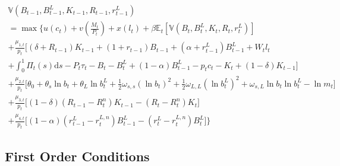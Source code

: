 \documentclass[11pt,a4paper,margin=1.5in]{article}
\begin{document}
\begin{multline}
	\mathbb{V}\!\left(B_{t-1}, B^L_{t-1}, K_{t-1}, R_{t-1}, r^L_{t-1}\right) \\= \max \Bigg\{u(c_t) + v\left(\frac{M_t}{P_t}\right) + x(l_t)  + \beta\mathbb{E}_t\!\left[\mathbb{V}\!\left(B_{t}, B^L_{t}, K_{t}, R_{t}, r^L_{t}\right)\right] \\
	+ \frac{\mu_{1,t}}{p_t} \Big[(\delta + R_{t-1})K_{t-1} + (1+r_{t-1})B_{t-1} + (\alpha + r^L_{t-1})B^L_{t-1} + W_tl_t \\+ \int^1_0\Pi_t(s)\text{d}s -P_t\tau_t -B_t - B^{L}_t + (1-\alpha)B^L_{t-1} - p_tc_t - K_t + (1-\delta)K_{t-1}\Big] \\
	+ \frac{\mu_{2,t}}{p_t}\Bigg[\theta_0 + \theta_s \ln b_t + \theta_L \ln b^L_t + \frac{1}{2}\omega_{s,s} \left(\ln b_t\right)^2 + \frac{1}{2}\omega_{L,L} \left(\ln b^L_t\right)^2 + \omega_{s,L}\ln b_t \ln b^L_t-\ln m_t\Bigg] \\
	+ \frac{\mu_{3,t}}{p_t}\Big[(1-\delta)\left(R_{t-1}-R^{n}_t\right)K_{t-1} - \left(R_t-R^{n}_t\right)K_t \Big] \\
	+ \frac{\mu_{4,t}}{p_t} \Big[(1-\alpha)\left(r^L_{t-1}-r^{L,n}_t\right)B^L_{t-1} - \left(r^L_t-r^{L,n}_t\right)B^L_t\Big]\Bigg\}
	\label{eq:Bellman}
\end{multline}

\subsection{First Order Conditions}
\end{document}

